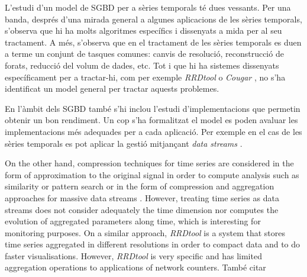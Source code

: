 L'estudi d'un model de SGBD per a sèries temporals té dues vessants.
Per una banda, després d'una mirada general a algunes aplicacions de
les sèries temporals, s'observa que hi ha molts algoritmes específics
i dissenyats a mida per al seu tractament. A més, s'observa que en el
tractament de les sèries temporals es duen a terme un conjunt de
tasques comunes: canvis de resolució, reconstrucció de forats,
reducció del volum de dades, etc.  Tot i que hi ha sistemes dissenyats
específicament per a tractar-hi, com per exemple
\emph{RRDtool} \parencite{rrdtool} o \emph{Cougar} \parencite{fung02},
no s'ha identificat un model general per tractar aquests problemes.




En l'àmbit dels SGBD també s'hi inclou l'estudi d'implementacions que
permetin obtenir un bon rendiment. Un cop s'ha formalitzat el model es
poden avaluar les implementacions més adequades per a cada
aplicació. Per exemple en el cas de les sèries temporals es pot
aplicar la gestió mitjançant \emph{data
  streams} \parencite{babcock02}.



On the other hand, compression techniques for time series are
considered in the form of approximation to the original signal in
order to compute analysis such as similarity or pattern search
\cite{fu11,keogh01,last01} or in the form of compression and
aggregation approaches for massive data streams
\cite{cormode08:pods,bonnet01}. However, treating time series as data
streams does not consider adequately the time dimension nor computes
the evolution of aggregated parameters along time, which is
interesting for monitoring purposes.  On a similar approach,
\emph{RRDtool} \cite{rrdtool} is a system that stores time series
aggregated in different resolutions in order to compact data and to do
faster visualisations. However, \emph{RRDtool} is very specific and
has limited aggregation operations to applications of network
counters.
També citar \cite{dou14:historic_queries_flash_storage}







